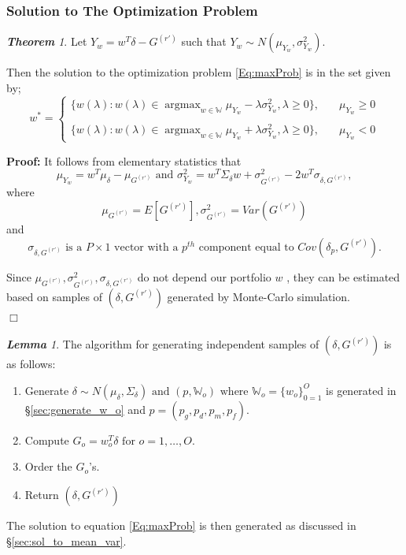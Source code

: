 \documentclass[12pt,oneside,a4paper]{book}
\theoremstyle{definition}
\theoremstyle{remark}
\newenvironment{prf}[0]{\textbf{Proof:}}{\hfill$\Box$}
\newtheorem{thm}{\bf Theorem}[subsection]
\newtheorem{lem}{\bf Lemma}[section]
\DeclareMathOperator*{\argmax}{argmax}
\begin{document}
				\subsubsection{Solution to The Optimization Problem}
					\begin{thm} \label{thm:solution_to_opt_prob}
						Let $Y_w = w^T\delta - G^{(r')}$ such that $Y_w \sim N(\mu_{Y_w}, \sigma^2_{Y_w}).$

						Then the solution to the optimization problem \ref{Eq:maxProb} is in the set given by;
						\begin{equation}\label{Eq:mean_var_problem}
							w^* =  {\begin{cases}
								{
									\{ w(\lambda):w(\lambda) \in \argmax_{w\in \mathbb{W}} \mu_{Y_w} - \lambda \sigma^2_{Y_w}, \lambda \ge0 \}
								}, \quad & \mu_{Y_w} \ge 0  \\\\
								{
									\{ w(\lambda):w(\lambda) \in \argmax_{w\in \mathbb{W}} \mu_{Y_w} + \lambda \sigma^2_{Y_w}, \lambda \ge0 \}
								}, \quad & \mu_{Y_w} < 0
							\end{cases}}
						\end{equation}

						\begin{prf}
							It follows from elementary statistics that
							\[
							\mu_{Y_w} =  w^T\mu_{\delta} - \mu_{G^{(r')}} \text{ and } \sigma^2_{Y_w} = w^T\Sigma_{\delta}w + \sigma^2_{G^{(r')}} - 2w^T\sigma_{\delta, G^{(r')}},
							\]
							where \[
							\mu_{G^{(r')}} = E[G^{(r')}], \sigma^2_{G^{(r')}} = Var(G^{(r')})\] and \[ \sigma_{\delta, G^{(r')}} \text{ is a } P\times 1 \text{ vector with a } p^{th}\text{ component equal to } Cov(\delta_p, G^{(r')}).
							\]

							Since $\mu_{G^{(r')}}, \sigma^2_{G^{(r')}}, \sigma_{\delta, G^{(r')}}$ do not depend our portfolio $w$ , they can be estimated based on samples of $(\delta, G^{(r')})$ generated by Monte-Carlo simulation.\\

						\end{prf}
					\end{thm}

					\begin{lem}	\label{alg:gen_ind} \cite{morton2003optimizing}
						The algorithm for generating independent samples of $(\delta, G^{(r')})$ is as follows:
						\begin{enumerate}
							\item Generate $\delta \sim N(\mu_\delta, \Sigma_\delta) \text{ and } (p,\mathbb{W}_o) \text{ where } \mathbb{W}_o = \{ w_o\}_{0=1}^O$ is generated in \S \ref{sec:generate_w_o} and $p = (p_g, p_d, p_m, p_f)$.
							\item Compute $G_o = w_o^T\delta \text{ for } o = 1, \dots, O.$
							\item Order the $G_o$'s.
							\item Return $(\delta, G^{(r')})$
						\end{enumerate}
					\end{lem}
					The solution to equation \eqref{Eq:maxProb} is then generated as discussed in \S \ref{sec:sol_to_mean_var}.\\
\end{document}
